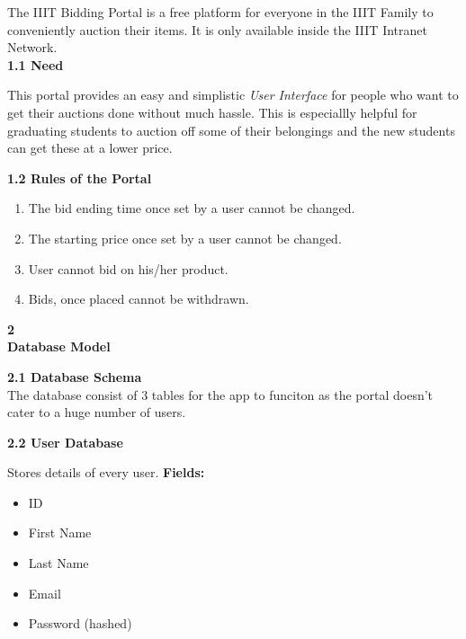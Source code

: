 \documentclass[a4paper,12pt]{article}
\begin{document}
\normalsize 
\setlength{\parindent}{15pt} 
The IIIT Bidding Portal is a free platform for everyone in the IIIT Family to conveniently auction their items. It is only available inside the IIIT Intranet Network. \\
\flushleft 
\large {\textbf {1.1  Need} } \vspace{5pt}

\hspace{15pt} \normalsize This portal provides an easy and simplistic \emph{User Interface} for people who want to get their auctions done without much hassle. This is especiallly helpful for graduating students to auction off some of their belongings and the new students can get these at a lower price. \vspace{10pt}

\large {\textbf {1.2 Rules of the Portal} } \\ \vspace{5pt}

\begin{enumerate}
 \item The bid ending time once set by a user cannot be changed.
 \item The starting price once set by a user cannot be changed.
 \item User cannot bid on his/her product.
 \item Bids, once placed cannot be withdrawn.
\end{enumerate}


\huge{\textbf{2 \\ Database Model}} \vspace{12pt}

\normalsize

\large{\textbf{2.1 Database Schema}}\\ \vspace{5pt} 
\hspace{15pt} The database consist of 3 tables for the app to funciton as the portal doesn't cater to a huge number of users.

\large{\textbf{2.2 User Database}} \\  \vspace{5pt}

\hspace{15pt} Stores details of every user. \newline
\textbf{Fields:}

\begin{itemize}
 \item ID
 \item First Name
 \item Last Name
 \item Email
 \item Password (hashed)
\end{itemize}
\end{document}
